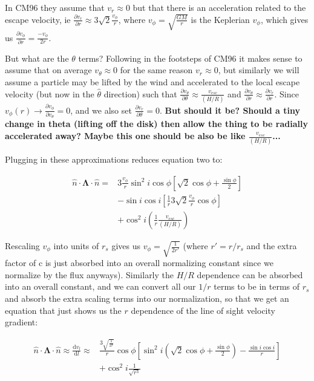 \documentclass{article}
\begin{document}
In CM96 they assume that $v_r \approx 0$ but that there is an acceleration related to the escape velocity, ie $\frac{\partial v_r}{\partial r} \approx 3\sqrt{2}\frac{v_\phi}{r}$, where $v_\phi = \sqrt{\frac{GM}{r}}$ is the Keplerian $v_\phi$, which gives us $\frac{\partial v_\phi}{\partial r} =  \frac{-v_\phi}{2r}$.

But what are the $\theta$ terms? Following in the footsteps of CM96 it makes sense to assume that on average $v_\theta \approx 0$ for the same reason $v_r \approx 0$, but similarly we will assume a particle may be lifted by the wind and accelerated to the local escape velocity (but now in the $\hat{\theta}$ direction) such that $\frac{\partial v_\theta}{\partial \theta} \approx \frac{v_{esc}}{\left(H/R\right)}$ and $\frac{\partial v_\theta}{\partial r} \approx \frac{\partial v_r}{\partial r}$. Since $v_\phi(r) \rightarrow \frac{\partial v_\phi}{\partial v_\theta} = 0$, and we also set $\frac{\partial v_r}{\partial \theta} = 0$. \textbf{But should it be? Should a tiny change in theta (lifting off the disk) then allow the thing to be radially accelerated away? Maybe this one should be also be like $\frac{v_{esc}}{(H/R)}$...}

Plugging in these approximations reduces equation two to:

\begin{equation} \label{eq3}
\begin{split}
\hat{n}\cdot\boldsymbol{\Lambda}\cdot\hat{n} = & 3\frac{v_\phi}{r} \sin^2i\cos\phi\left[\sqrt{2}\cos\phi + \frac{\sin\phi}{2}\right]\\
& -\sin i \cos i \left[\frac{1}{r}3\sqrt{2}\frac{v_\phi}{r}\cos\phi\right] \\
& +\cos^2i\left(\frac{1}{r}\frac{v_{esc}}{(H/R)}\right)
\end{split}
\end{equation}

Rescaling $v_\phi$ into units of $r_s$ gives us $v_\phi = \sqrt{\frac{1}{2r'}}$ (where $r' = r/r_s$ and the extra factor of c is just absorbed into an overall normalizing constant since we normalize by the flux anyways). Similarly the $H/R$ dependence can be absorbed into an overall constant, and we can convert all our $1/r$ terms to be in terms of $r_s$ and absorb the extra scaling terms into our normalization, so that we get an equation that just shows us the $r$ dependence of the line of sight velocity gradient:

\begin{equation} \label{eq4}
\begin{split}
\hat{n}\cdot\boldsymbol{\Lambda}\cdot\hat{n} \approx \frac{\mathrm{d}v_l}{\mathrm{d}l} \approx & \frac{3\sqrt{\frac{1}{2r}}}{r}\cos\phi\left[\sin^2i\left(\sqrt{2}\cos\phi + \frac{\sin\phi}{2}\right)-\frac{\sin i \cos i}{r}\right]\\
& + \cos^2i\frac{1}{\sqrt{r^3}}
\end{split}
\end{equation}
\end{document}
